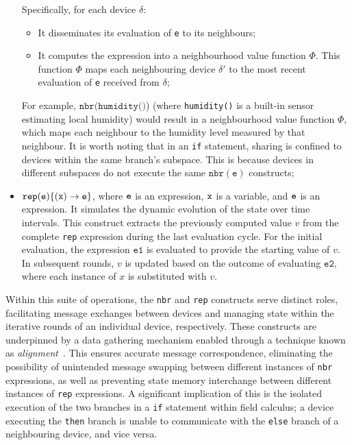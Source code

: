 \begin{itemize}
     Specifically, for each device $\delta$:
    \begin{itemize}
        \item It disseminates its evaluation of \texttt{e} to its neighbours;
        \item It computes the expression into a neighbourhood value function $\Phi$. This function $\Phi$ maps each neighbouring device $\delta'$ to the most recent evaluation of \texttt{e} received from $\delta$;
    \end{itemize}
    For example, $\texttt{nbr}(\texttt{humidity()}$) (where \texttt{humidity()} is a built-in sensor estimating local humidity) would result in a neighbourhood value function $\Phi$, 
    which maps each neighbour to the humidity level measured by that neighbour. 
    It is worth noting that in an \texttt{if} statement, 
    sharing is confined to devices within the same branch's subspace.
    This is because devices in different subspaces do not execute the same $\texttt{nbr}(\texttt{e})$ constructs;
    \item $\texttt{rep}(\texttt{e})\{(\texttt{x}) \rightarrow \texttt{e}\}$, where $\texttt{e}$ is an expression, $\texttt{x}$ is a variable, and $\texttt{e}$ is an expression. 
    It simulates the dynamic evolution of the state over time intervals. 
    This construct extracts the previously computed value \( v \) from the complete \texttt{rep} expression during the last evaluation cycle. 
    For the initial evaluation, the expression \( \texttt{e1} \) is evaluated to provide the starting value of \( v \). In subsequent rounds, 
    \( v \) is updated based on the outcome of evaluating \( \texttt{e2} \),
    where each instance of \( x \) is substituted with \( v \).
\end{itemize}
Within this suite of operations, 
 the \texttt{nbr} and \texttt{rep} constructs serve distinct roles, 
 facilitating message exchanges between devices and managing state within the iterative rounds of an individual device, respectively. 
%
These constructs are underpinned by a data gathering mechanism enabled through a technique known as \emph{alignment}~\cite{audrito2016run}. 
This ensures accurate message correspondence, 
 eliminating the possibility of unintended message swapping between different instances of \texttt{nbr} expressions, 
 as well as preventing state memory interchange between different instances of \texttt{rep} expressions. 
% 
A significant implication of this is the isolated execution of the two branches in a \texttt{if} statement within field calculus; 
  a device executing the \texttt{then} branch is unable to communicate with the \texttt{else} branch of a neighbouring device, and vice versa.
%

